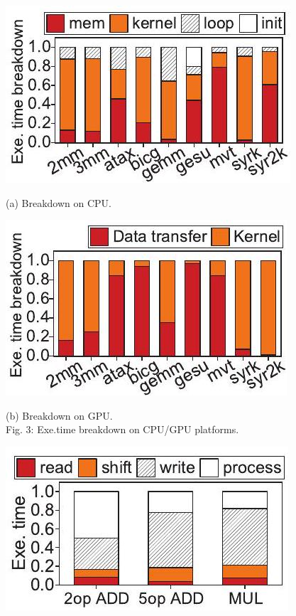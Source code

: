 \documentclass[10pt]{article}
\begin{document}
\begin{center}
\includegraphics[max width=\textwidth]{2024_05_12_abeba8a85da5b5ec4c7bg-03(3)}
\end{center}

(a) Breakdown on CPU.

\begin{center}
\includegraphics[max width=\textwidth]{2024_05_12_abeba8a85da5b5ec4c7bg-03(4)}
\end{center}

(b) Breakdown on GPU.\\
Fig. 3: Exe.time breakdown on CPU/GPU platforms.

\begin{center}
\includegraphics[max width=\textwidth]{2024_05_12_abeba8a85da5b5ec4c7bg-03(2)}
\end{center}
\end{document}
